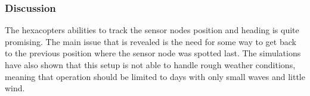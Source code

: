 \subsubsection{Discussion}
The hexacopters abilities to track the sensor nodes position and heading is quite promising. The main issue that is revealed is the need for some way to get back to the previous position where the sensor node was spotted last. The simulations have also shown that this setup is not able to handle rough weather conditions, meaning that operation should be limited to days with only small waves and little wind.